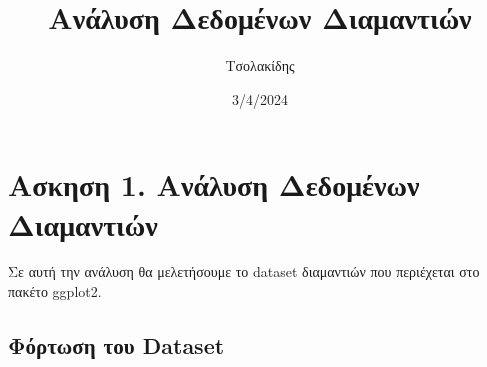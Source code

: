 \documentclass[
]{article}
\title{Ανάλυση Δεδομένων Διαμαντιών}
\author{Τσολακίδης}
\date{3/4/2024}
\newenvironment{Shaded}{\begin{snugshade}}{\end{snugshade}}
\newcommand{\CommentTok}[1]{\textcolor[rgb]{0.56,0.35,0.01}{\textit{#1}}}
\newcommand{\FunctionTok}[1]{\textcolor[rgb]{0.13,0.29,0.53}{\textbf{#1}}}
\newcommand{\NormalTok}[1]{#1}
\newcommand{\OtherTok}[1]{\textcolor[rgb]{0.56,0.35,0.01}{#1}}
\newcommand{\SpecialCharTok}[1]{\textcolor[rgb]{0.81,0.36,0.00}{\textbf{#1}}}
\newcommand{\StringTok}[1]{\textcolor[rgb]{0.31,0.60,0.02}{#1}}
\begin{document}
\maketitle

{
\setcounter{tocdepth}{2}
\tableofcontents
}
\hypertarget{ux3b1ux3c3ux3baux3b7ux3c3ux3b7-1.-ux3b1ux3bdux3acux3bbux3c5ux3c3ux3b7-ux3b4ux3b5ux3b4ux3bfux3bcux3adux3bdux3c9ux3bd-ux3b4ux3b9ux3b1ux3bcux3b1ux3bdux3c4ux3b9ux3ceux3bd}{%
\section{Ασκηση 1. Ανάλυση Δεδομένων
Διαμαντιών}\label{ux3b1ux3c3ux3baux3b7ux3c3ux3b7-1.-ux3b1ux3bdux3acux3bbux3c5ux3c3ux3b7-ux3b4ux3b5ux3b4ux3bfux3bcux3adux3bdux3c9ux3bd-ux3b4ux3b9ux3b1ux3bcux3b1ux3bdux3c4ux3b9ux3ceux3bd}}

Σε αυτή την ανάλυση θα μελετήσουμε το dataset διαμαντιών που περιέχεται
στο πακέτο ggplot2.

\hypertarget{ux3c6ux3ccux3c1ux3c4ux3c9ux3c3ux3b7-ux3c4ux3bfux3c5-dataset}{%
\subsection{Φόρτωση του
Dataset}\label{ux3c6ux3ccux3c1ux3c4ux3c9ux3c3ux3b7-ux3c4ux3bfux3c5-dataset}}

\begin{Shaded}
\end{Shaded}
\end{document}
